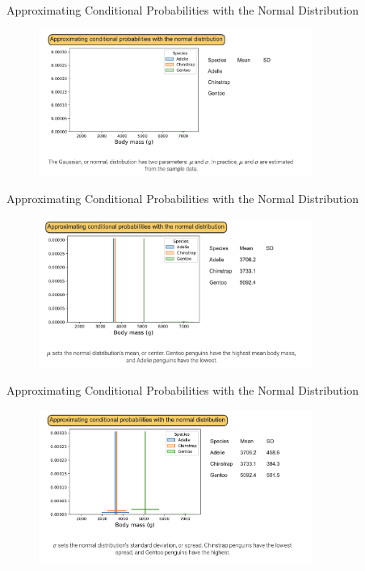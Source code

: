 \documentclass[10pt,dvipsnames]{beamer}
\begin{document}
\begin{frame}{Approximating Conditional Probabilities with the Normal Distribution}
		\begin{figure}[ht]
		\centering
		\includegraphics[width=0.8\textwidth]{imgs/nb_20.png}
	\end{figure}
\end{frame}

\begin{frame}{Approximating Conditional Probabilities with the Normal Distribution}
	\begin{figure}[ht]
		\centering
		\includegraphics[width=0.8\textwidth]{imgs/nb_21.png}
	\end{figure}
\end{frame}

\begin{frame}{Approximating Conditional Probabilities with the Normal Distribution}
	\begin{figure}[ht]
		\centering
		\includegraphics[width=0.8\textwidth]{imgs/nb_22.png}
	\end{figure}
\end{frame}
\end{document}
